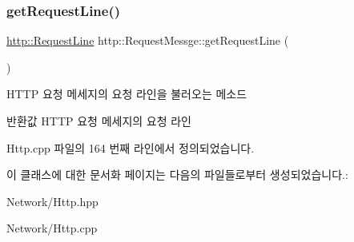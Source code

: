 \subsubsection{\texorpdfstring{get\+Request\+Line()}{getRequestLine()}}
{\footnotesize\ttfamily \hyperlink{structhttp_1_1_request_line}{http\+::\+Request\+Line} http\+::\+Request\+Messge\+::get\+Request\+Line (\begin{DoxyParamCaption}{ }\end{DoxyParamCaption})}



H\+T\+TP 요청 메세지의 요청 라인을 불러오는 메소드 

\begin{DoxyReturn}{반환값}
H\+T\+TP 요청 메세지의 요청 라인 
\end{DoxyReturn}


Http.\+cpp 파일의 164 번째 라인에서 정의되었습니다.



이 클래스에 대한 문서화 페이지는 다음의 파일들로부터 생성되었습니다.\+:\begin{DoxyCompactItemize}
\item 
Network/Http.\+hpp\item 
Network/Http.\+cpp\end{DoxyCompactItemize}
